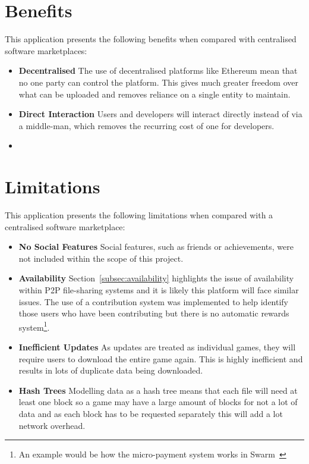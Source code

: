 
\section{Benefits}

This application presents the following benefits when compared with centralised software marketplaces:

\begin{itemize}
  \item \textbf{Decentralised} The use of decentralised platforms like Ethereum mean that no one party can control the platform. This gives much greater freedom over what can be uploaded and removes reliance on a single entity to maintain.
  \item \textbf{Direct Interaction} Users and developers will interact directly instead of via a middle-man, which removes the recurring cost of one for developers.
  \item \textbf{}
\end{itemize}

\section{Limitations}\label{sec:design-lim}

This application presents the following limitations when compared with a centralised software marketplace:

\begin{itemize}
  \item \textbf{No Social Features} Social features, such as friends or achievements, were not included within the scope of this project.
  \item \textbf{Availability} Section~\ref{subsec:availability} highlights the issue of availability within P2P file-sharing systems and it is likely this platform will face similar issues.
  The use of a contribution system was implemented to help identify those users who have been contributing but there is no automatic rewards system\footnote{An example would be how the micro-payment system works in Swarm~\cite{hartman_swarm_1999}}.
  \item \textbf{Inefficient Updates} As updates are treated as individual games, they will require users to download the entire game again. This is highly inefficient and results in lots of duplicate data being downloaded.
  \item \textbf{Hash Trees} Modelling data as a hash tree means that each file will need at least one block so a game may have a large amount of blocks for not a lot of data and as each block has to be requested separately this will add a lot network overhead. 
\end{itemize}